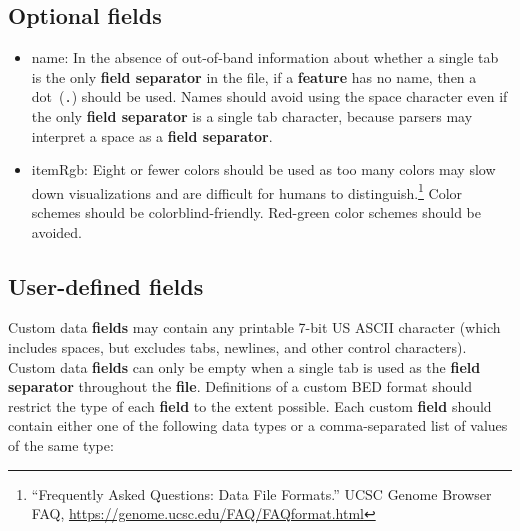 \documentclass[11pt]{article}
\begin{document}
\subsection{Optional fields}\label{sec:optional}
\begin{itemize}
\item \textsf{name}: In the absence of out-of-band information about whether a single tab is the only \textbf{field separator} in the file, if a \textbf{feature} has no name, then a dot~(\texttt{.}) should be used.
  Names should avoid using the space character even if the only \textbf{field separator} is a single tab character, because parsers may interpret a space as a \textbf{field separator}.

\item \textsf{itemRgb}: Eight or fewer colors should be used as too many colors may slow down visualizations and are difficult for humans to distinguish.\footnote{``Frequently
    Asked Questions: Data File Formats.'' \ac{UCSC} Genome Browser FAQ,
    \url{https://genome.ucsc.edu/FAQ/FAQformat.html}}
  Color schemes should be colorblind-friendly.
  Red-green color schemes should be avoided.

\end{itemize}

\subsection{User-defined fields}

Custom data \textbf{fields} may contain any printable 7-bit US \ac{ASCII} character (which includes spaces, but excludes tabs, newlines, and other control characters).
Custom data \textbf{fields} can only be empty when a single tab is used as the \textbf{field separator} throughout the \textbf{file}.
Definitions of a custom \ac{BED} format should restrict the type of each \textbf{field} to the extent possible.
Each custom \textbf{field} should contain either one of the following data types or a comma-separated list of values of the same type:

\noindent
{}
\end{document}
